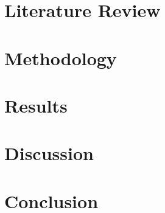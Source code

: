 \documentclass[12pt, twoside]{report}
\begin{document}
\chapter{Literature Review}

\chapter{Methodology}

\chapter{Results}

\chapter{Discussion}

\chapter{Conclusion}



\end{document}
